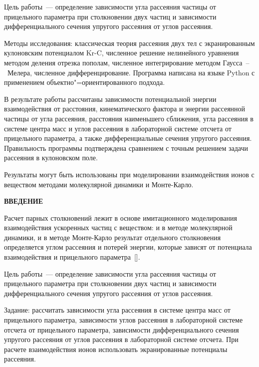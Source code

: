 \documentclass[a4paper,14pt]{extarticle}
\newcommand{\structuralelement}[1]{%
  \clearpage\phantomsection
  \addcontentsline{toc}{section}{#1}%
  {\centering\bfseries #1\par}\vspace{18pt}}
\newcommand{\citeitem}[1]{\citesep\ref{#1}\def\citesep{,~}}
\newcommand{\cit}[1]{[\def\citesep{}\forcsvlist{\citeitem}{#1}]}
\begin{document}
Цель работы~--- определение зависимости угла рассеяния частицы от прицельного
параметра при столкновении двух частиц и зависимости дифференциального сечения
упругого рассеяния от углов рассеяния.

Методы исследования: классическая теория рассеяния двух тел
с экранированным кулоновским потенциалом Kr-C, численное решение нелинейного
уравнения методом деления отрезка пополам, численное интегрирование методом
Гаусса~--~Мелера, численное дифференцирование. Программа написана на языке
Python с применением объектно"=ориентированного подхода.

В результате работы рассчитаны зависимости потенциальной энергии
взаимодействия от расстояния, кинематического фактора и энергии рассеянной
частицы от угла рассеяния, расстояния наименьшего сближения, угла рассеяния
в системе центра масс и углов рассеяния в лабораторной системе отсчета от
прицельного параметра, а также дифференциальные сечения упругого рассеяния.
Правильность программы подтверждена сравнением с точным решением задачи
рассеяния в кулоновском поле.

Результаты могут быть использованы при моделировании взаимодействия
ионов с веществом методами молекулярной динамики и Монте-Карло.

\clearpage
\tableofcontents

\structuralelement{ВВЕДЕНИЕ}

Расчет парных столкновений лежит в основе имитационного моделирования
взаимодействия ускоренных частиц с веществом: и в методе молекулярной
динамики, и в методе Монте-Карло результат отдельного столкновения
определяется углом рассеяния и потерей энергии, которые зависят от потенциала
взаимодействия и прицельного параметра~\cit{ref:manual}.

Цель работы~--- определение зависимости угла рассеяния частицы от прицельного
параметра при столкновении двух частиц и зависимости дифференциального сечения
упругого рассеяния от углов рассеяния.

Задание: рассчитать зависимости угла рассеяния в системе центра масс от
прицельного параметра, зависимости углов рассеяния в лабораторной системе
отсчета от прицельного параметра, зависимости дифференциального сечения
упругого рассеяния от углов рассеяния в лабораторной системе отсчета.
При расчете взаимодействия ионов использовать экранированные потенциалы
рассеяния.
\end{document}
